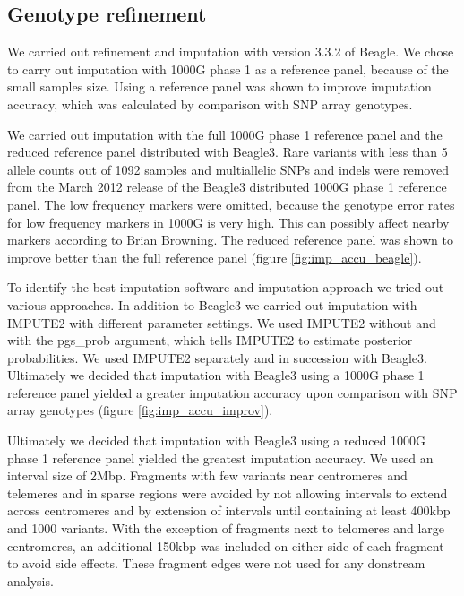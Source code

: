 \subsection{Genotype refinement}
We carried out refinement and imputation with version 3.3.2 of Beagle.\cite{Browning20071084} We chose to carry out imputation with \gls{1000G} phase 1 as a reference panel, because of the small samples size. Using a reference panel was shown to improve imputation accuracy, which was calculated by comparison with SNP array genotypes.


We carried out imputation with the full 1000G phase 1 reference panel and the reduced reference panel distributed with Beagle3. Rare variants with less than 5 allele counts out of 1092 samples and multiallelic SNPs and indels were removed from the March 2012 release of the Beagle3 distributed 1000G phase 1 reference panel. The low frequency markers were omitted, because the genotype error rates for low frequency markers in 1000G is very high. This can possibly affect nearby markers according to Brian Browning. The reduced reference panel was shown to improve better than the full reference panel (figure \ref{fig:imp_accu_beagle}).


To identify the best imputation software and imputation approach we tried out various approaches. In addition to Beagle3 we carried out imputation with IMPUTE2\cite{10.1371/journal.pgen.1000529} with different parameter settings. We used IMPUTE2 without and with the \-\-pgs\_prob argument, which tells IMPUTE2 to estimate posterior probabilities. We used IMPUTE2 separately and in succession with Beagle3. Ultimately we decided that imputation with Beagle3\cite{Browning20071084} using a \gls{1000G} phase 1 reference panel yielded a greater imputation accuracy upon comparison with SNP array genotypes (figure \ref{fig:imp_accu_improv}).


Ultimately we decided that imputation with Beagle3 using a reduced \gls{1000G} phase 1 reference panel yielded the greatest imputation accuracy. We used an interval size of 2\gls{Mbp}. Fragments with few variants near centromeres and telemeres and in sparse regions were avoided by not allowing intervals to extend across centromeres and by extension of intervals until containing at least 400\gls{kbp} and 1000 variants. With the exception of fragments next to telomeres and large centromeres, an additional 150\gls{kbp} was included on either side of each fragment to avoid side effects. These fragment edges were not used for any donstream analysis.

